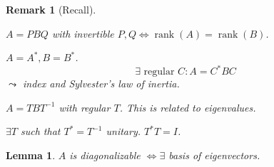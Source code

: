 \documentclass{article}
\newcounter{lecref}[section]
\numberwithin{lecref}{section}
\newtheorem{lemma}[lecref]{Lemma}
\newtheorem{remark}[lecref]{Remark}
\DeclareMathOperator{\rank}{rank}
\begin{document}
\begin{remark}[Recall]\hfill{}
  \begin{description}
    {\leftskip=15pt
    \item[Equivalence] $A = PBQ$ with invertible $P,Q \iff \rank(A) = \rank(B)$.
    \item[Congruence]
      $A = A^*, B = B^*$.
      \[ \exists \text{ regular } C: A = C^* BC \]
      $\leadsto$ index and Sylvester's law of inertia.
    \item[Similarity] $A = TBT^{-1}$ with regular $T$. This is related to eigenvalues.
    \item[Later on] $\exists T$ such that $T^* = T^{-1}$ unitary. $T^{*} T = I$.

    }
  \end{description}
\end{remark}

\begin{lemma} %
  $A$ is diagonalizable $\iff \exists$ basis of eigenvectors.
\end{lemma}
\end{document}
